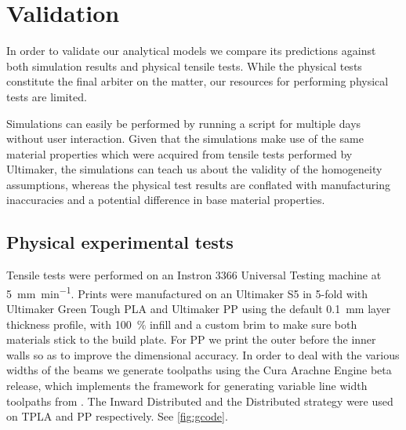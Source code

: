 \section{Validation}
In order to validate our analytical models we compare its predictions against both simulation results and physical tensile tests.
While the physical tests constitute the final arbiter on the matter,
our resources for performing physical tests are limited.

Simulations can easily be performed by running a script for multiple days without user interaction.
Given that the simulations make use of the same material properties which were acquired from tensile tests performed by Ultimaker,
the simulations can teach us about the validity of the homogeneity assumptions,
whereas the physical test results are conflated with manufacturing inaccuracies and a potential difference in base material properties.








\subsection{Physical experimental tests}
Tensile tests were performed on an Instron 3366 Universal Testing machine at \SI{5}{\milli\meter\per\minute}.
Prints were manufactured on an Ultimaker S5 in 5-fold with Ultimaker Green Tough PLA and Ultimaker PP using the default \SI{0.1}{\milli\meter} layer thickness profile,
with \SI{100}{\percent} infill and a custom brim to make sure both materials stick to the build plate.
For PP we print the outer before the inner walls so as to improve the dimensional accuracy. %
In order to deal with the various widths of the beams we generate toolpaths using the Cura Arachne Engine beta release\cite{CuraArachne},
which implements the framework for generating variable line width toolpaths from \cite{Kuipers2020}.
The Inward Distributed and the Distributed strategy were used on TPLA and PP respectively.
See \cref{fig:gcode}.



